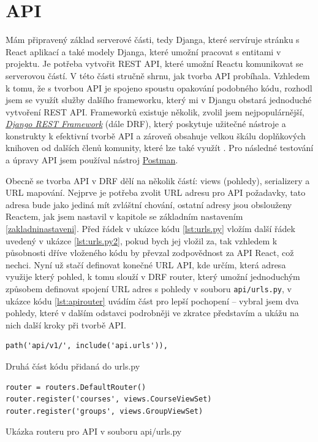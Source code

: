     \section{API}
    Mám připravený základ serverové části, tedy Djanga, které servíruje stránku s React aplikací a také modely Djanga, které umožní pracovat s entitami v projektu. Je potřeba vytvořit REST API, které umožní Reactu komunikovat se serverovou částí. V této části stručně shrnu, jak tvorba API probíhala. Vzhledem k tomu, že s tvorbou API je spojeno spoustu opakování podobného kódu, rozhodl jsem se využít služby dalšího frameworku, který mi v Djangu obstará jednoduché vytvoření REST API. Frameworků existuje několik, zvolil jsem nejpopulárnější, \href{http://www.django-rest-framework.org/}{\textit{Django REST Framework}} (dále DRF), který poskytuje užitečné nástroje a konstrukty k efektivní tvorbě API a zároveň obsahuje velkou škálu doplňkových knihoven od dalších členů komunity, které lze také využít \cite{drf2}. Pro následné testování a úpravy API jsem používal nástroj \href{https://www.getpostman.com/}{Postman}.
    
    Obecně se tvorba API v DRF dělí na několik částí: views (pohledy), serializery a URL mapování. Nejprve je potřeba zvolit URL adresu pro API požadavky, tato adresa bude jako jediná mít zvláštní chování, ostatní adresy jsou obslouženy Reactem, jak jsem nastavil v kapitole se základním nastavením \ref{zakladninastaveni}. Před řádek v ukázce kódu \ref{lst:urls.py} vložím další řádek uvedený v ukázce \ref{lst:urls.py2}, pokud bych jej vložil za, tak vzhledem k působnosti dříve vloženého kódu by převzal zodpovědnost za API React, což nechci. Nyní už stačí definovat konečné URL API, kde určím, která adresa využije který pohled, k tomu slouží v DRF router, který umožní jednoduchým způsobem definovat spojení URL adres s pohledy v souboru \verb|api/urls.py|, v ukázce kódu \ref{lst:apirouter} uvádím část pro lepší pochopení -- vybral jsem dva pohledy, které v dalším odstavci podrobněji ve zkratce představím a ukážu na nich další kroky při tvorbě API.
    
    \begin{listing}[ht]
    	\begin{verbatim}
path('api/v1/', include('api.urls')),
    	\end{verbatim}
    	\caption{Druhá část kódu přidaná do urls.py}\label{lst:urls.py2}
    \end{listing}
    
    \begin{listing}[ht]
    	\begin{verbatim}
router = routers.DefaultRouter()
router.register('courses', views.CourseViewSet)
router.register('groups', views.GroupViewSet)
    	\end{verbatim}
    	\caption{Ukázka routeru pro API v souboru api/urls.py}\label{lst:apirouter}
    \end{listing}
    
